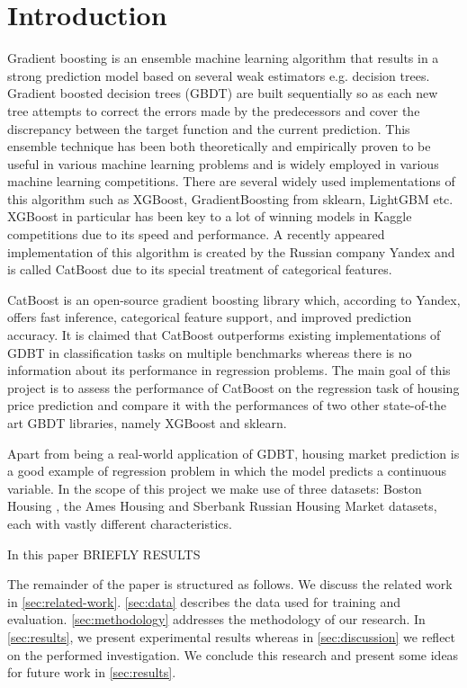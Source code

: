 \section{Introduction}
\label{sec:introduction}

Gradient boosting is an ensemble machine learning algorithm that results in a strong prediction model based on several weak estimators e.g. decision trees. Gradient boosted decision trees (GBDT) are built sequentially so as each new tree attempts to correct the errors made by the predecessors and cover the discrepancy between the target function and the current prediction. This ensemble technique has been both theoretically and empirically proven to be useful in various machine learning problems and is widely employed in various machine learning competitions. There are several widely used implementations of this algorithm such as XGBoost, GradientBoosting from sklearn, LightGBM etc. XGBoost in particular has been key to a lot of winning models in Kaggle competitions due to its speed and performance. A recently appeared implementation of this algorithm is created by the Russian company Yandex and is called CatBoost due to its special treatment of categorical features.

CatBoost is an open-source gradient boosting library which, according to Yandex, offers fast inference, categorical feature support, and improved prediction accuracy. It is claimed that CatBoost outperforms existing implementations of GDBT in classification tasks on multiple benchmarks whereas there is no information about its performance in regression problems. The main goal of this project is to assess the performance of CatBoost on the regression task of housing price prediction and compare it with the performances of two other state-of-the art GBDT libraries, namely XGBoost and sklearn.

Apart from being a real-world application of GDBT, housing market prediction is a good example of regression problem in which the model predicts a continuous variable. In the scope of this project we make use of three datasets: Boston Housing \cite{boston1978housing}, the Ames Housing \cite{de2011ames} and Sberbank Russian Housing Market \cite{sberbank2017housing} datasets, each with vastly different characteristics.

In this paper BRIEFLY RESULTS

The remainder of the paper is structured as follows. We discuss the related work in \cref{sec:related-work}. \cref{sec:data} describes the data used for training and evaluation. \cref{sec:methodology} addresses the methodology of our research. In \cref{sec:results}, we present experimental results whereas in \cref{sec:discussion} we reflect on the performed investigation. We conclude this research and present some ideas for future work in \cref{sec:results}.